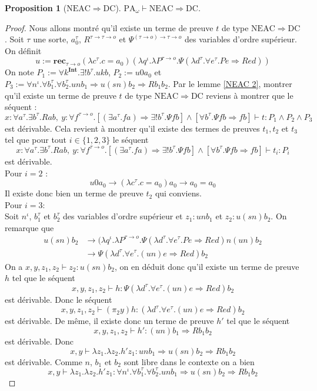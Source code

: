 \documentclass[a4paper,12pt]{article}
\newtheorem{prop}[theo]{Proposition}
\theoremstyle{rmqstyle}
\newcommand{\set}[1]{\{#1\}}
\newcommand{\PA}{\mathrm{PA}}
\renewcommand{\int}{\mathbf{Int}}
\newcommand{\rec}{\mathbf{rec}}
\renewcommand{\implies}{\Rightarrow}
\newcommand{\NEAC}{\mathrm{NEAC}}
\newcommand{\DC}{\mathrm{DC}}
\begin{document}
\begin{prop}[$\NEAC \implies \DC$]
$\PA_\omega \vdash \NEAC \implies \DC$.
\end{prop}

\begin{proof}
Nous allons montré qu'il existe un terme de preuve $t$ de type $\NEAC \implies \DC$. Soit $\tau$ une sorte, $a_0^\tau$, $R^{\tau \to \tau \to o}$ et $\Psi^{(\tau \to o) \to \tau \to o}$ des variables d'ordre supérieur. On définit 
$$ u := \rec_{\tau \to o} (\lambda c^\tau. c = a_0) (\lambda q^\iota. \lambda P^{\tau \to o}. \Psi (\lambda d^\tau. \forall e^\tau. P e \implies Red))$$
On note $P_1 := \forall k^\int. \exists ! b^\tau. ukb$, $P_2:= u 0 a_0$ et $P_3 := \forall n^\iota. \forall b_1^\tau. \forall b_2^\tau. u n b_1 \implies u (sn) b_2 \implies R b_1 b_2$. Par le lemme \ref{NEAC 2}, montrer qu'il existe un terme de preuve $t$ de type $\NEAC \implies \DC$ reviens à montrer que le séquent :
$$ x : \forall a^\tau. \exists b^\tau. R a b, \ y : \forall f^{\tau \to o}.[( \exists a^\tau. fa) \implies \exists ! b^\tau.\Psi f b] \land [\forall b^\tau. \Psi f b \implies fb] \vdash t : P_1 \land P_2 \land P_3$$
est dérivable. Cela revient à montrer qu'il existe des termes de preuves $t_1, t_2$ et $t_3$ tel que pour tout $i \in \set{1,2,3}$ le séquent 
$$x : \forall a^\tau. \exists b^\tau. R a b, \ y : \forall f^{\tau \to o}.[( \exists a^\tau. fa) \implies \exists ! b^\tau.\Psi f b] \land [\forall b^\tau. \Psi f b \implies fb] \vdash t_i: P_i $$
est dérivable.\\

Pour $i = 2$ :\\
$$u 0 a_0 \longrightarrow (\lambda c^\tau. c = a_0) a_0 \longrightarrow a_0 = a_0$$
Il existe donc bien un terme de preuve $t_2$ qui conviens.\\

Pour $i = 3$:\\
Soit $n^\iota$, $b_1^\tau$ et $b_2^\tau$ des variables d'ordre supérieur et $z_1 : u n b_1$ et $z_2 : u (sn) b_2$.  On remarque que 
\begin{align*}
u (sn) b_2 &\longrightarrow (\lambda q^\iota. \lambda P^{\tau \to o}. \Psi (\lambda d^\tau. \forall e^\tau. P e \implies Red) n (u n) b_2\\
&\longrightarrow \Psi (\lambda d^\tau. \forall e^\tau. (un) e \implies Red) b_2
\end{align*}
On a  $x,y,z_1,z_2 \vdash z_2 : u (sn) b_2$, on en déduit donc qu'il existe un terme de preuve $h$ tel que le séquent
$$x,y,z_1,z_2 \vdash h: \Psi (\lambda d^\tau. \forall e^\tau. (un) e \implies Red) b_2$$
est dérivable. Donc le séquent 
$$x,y,z_1,z_2 \vdash (\pi_2 y) h: (\lambda d^\tau. \forall e^\tau. (un) e \implies Red) b_2$$
est dérivable. De même, il existe donc un terme de preuve $h'$ tel que le séquent
$$x,y,z_1,z_2 \vdash h': (un) b_1 \implies Rb_1b_2$$
est dérivable. Donc
$$x,y \vdash \lambda z_1. \lambda z_2. h'z_1: unb_1 \implies u(sn)b_2\implies Rb_1b_2$$
est dérivable. Comme $n$, $b_1$ et $b_2$ sont libre dans le contexte on a bien 
$$x,y \vdash \lambda z_1. \lambda z_2. h'z_1: \forall n^\iota. \forall b_1^\tau. \forall b_2^\tau. u n b_1 \implies u (sn) b_2 \implies Rb_1 b_2$$


\end{proof}
\end{document}
